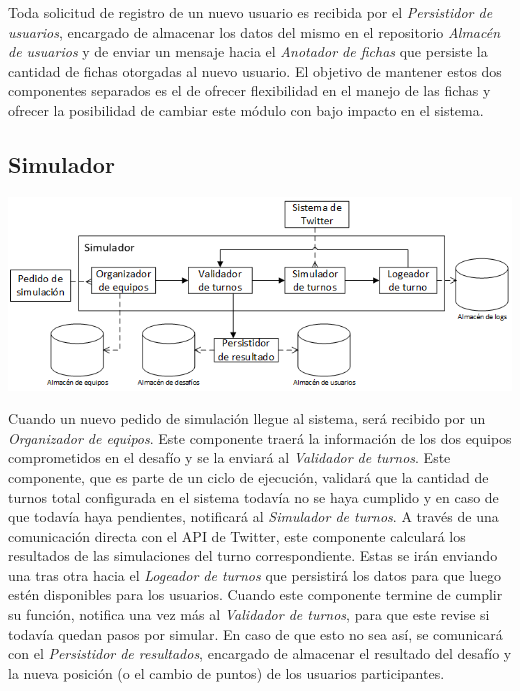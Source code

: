 Toda solicitud de registro de un nuevo usuario es recibida por el \emph{Persistidor de usuarios}, encargado de almacenar los datos del mismo en el repositorio \emph{Almacén de usuarios} y de enviar un mensaje hacia el \emph{Anotador de fichas} que persiste la cantidad de fichas otorgadas al nuevo usuario. El objetivo de mantener estos dos componentes separados es el de ofrecer flexibilidad en el manejo de las fichas y ofrecer la posibilidad de cambiar este módulo con bajo impacto en el sistema.

\subsection{Simulador}
\begin{center}
\includegraphics[scale=0.80]{diagramas/tp1/simulador.png}
\end{center}
\label{fig:simulador}

Cuando un nuevo pedido de simulación llegue al sistema, será recibido por un \emph{Organizador de equipos}. Este componente traerá la información de los dos equipos comprometidos en el desafío y se la enviará al \emph{Validador de turnos}. Este componente, que es parte de un ciclo de ejecución, validará que la cantidad de turnos total configurada en el sistema todavía no se haya cumplido y en caso de que todavía haya pendientes, notificará al \emph{Simulador de turnos}. A través de una comunicación directa con el API de Twitter, este componente calculará los resultados de las simulaciones del turno correspondiente. Estas se irán enviando una tras otra hacia el \emph{Logeador  de turnos} que persistirá los datos para que luego estén disponibles para los usuarios. Cuando este componente termine de cumplir su función, notifica una vez más al \emph{Validador de turnos}, para que este revise si todavía quedan pasos por simular. En caso de que esto no sea así, se comunicará con el \emph{Persistidor de resultados}, encargado de almacenar el resultado del desafío y la nueva posición (o el cambio de puntos) de los usuarios participantes.
